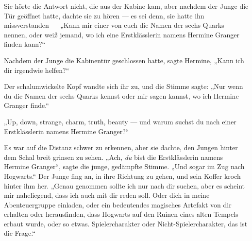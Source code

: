 Sie hörte die Antwort nicht, die aus der Kabine kam, aber nachdem der Junge die Tür geöffnet hatte, dachte sie zu hören — es sei denn, sie hatte ihn missverstanden —
„Kann mir einer von euch die Namen der sechs Quarks nennen, oder weiß jemand, wo ich eine Erstklässlerin namens Hermine Granger finden kann?“%

Nachdem der Junge die Kabinentür geschlossen hatte, sagte Hermine,
„Kann ich dir irgendwie helfen?“

Der schalumwickelte Kopf wandte sich ihr zu, und die Stimme sagte:
„Nur wenn du die Namen der sechs Quarks kennst oder mir sagen kannst, wo ich Hermine Granger finde.“

„Up, down, strange, charm, truth, beauty — und warum suchst du nach einer Erstklässlerin namens Hermine Granger?“

Es war auf die Distanz schwer zu erkennen, aber sie dachte, den Jungen hinter dem Schal breit grinsen zu sehen.
„Ach, \emph{du} bist die Erstklässlerin namens Hermine Granger“, sagte die junge, gedämpfte Stimme.
„Und sogar im Zug nach Hogwarts.“ Der Junge fing an, in ihre Richtung zu gehen, und sein Koffer kroch hinter ihm her.
„Genau genommen sollte ich nur nach dir suchen, aber es scheint mir naheliegend, dass ich auch mit dir reden soll. Oder dich in meine Abenteuergruppe einladen, oder ein bedeutendes magisches Artefakt von dir erhalten oder herausfinden, dass Hogwarts auf den Ruinen eines alten Tempels erbaut wurde, oder so etwas. Spielercharakter oder Nicht-Spielercharakter, das ist die Frage.“

